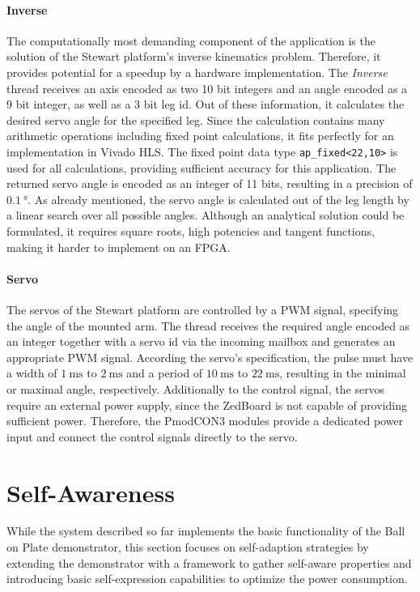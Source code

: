 \paragraph{Inverse} The computationally most demanding component of the
application is the solution of the Stewart platform's inverse kinematics
problem. Therefore, it provides potential for a speedup by a hardware
implementation. The \emph{Inverse} thread receives an axis encoded as two 10
bit integers and an angle encoded as a 9 bit integer, as well as a 3 bit leg
id. Out of these information, it calculates the desired servo angle for the
specified leg. Since the calculation contains many arithmetic operations
including fixed point calculations, it fits perfectly for an implementation in
Vivado HLS. The fixed point data type \lstinline{ap_fixed<22,10>} is used for
all calculations, providing sufficient accuracy for this application. The
returned servo angle is encoded as an integer of 11 bits, resulting in a
precision of $\SI{0.1}{\degree}$. As already mentioned, the servo angle is
calculated out of the leg length by a linear search over all possible angles.
Although an analytical solution could be formulated, it requires square roots,
high potencies and tangent functions, making it harder to implement on an
FPGA.

\paragraph{Servo} The servos of the Stewart platform are controlled by a
\ac{PWM} signal, specifying the angle of the mounted arm. The thread receives
the required angle encoded as an integer together with a servo id via the
incoming mailbox and generates an appropriate \ac{PWM} signal. According the
servo's specification, the pulse must have a width of $\SI{1}{\milli\second}$
to $\SI{2}{\milli\second}$ and a period of $\SI{10}{\milli\second}$ to
$\SI{22}{\milli\second}$, resulting in the minimal or maximal angle,
respectively. Additionally to the control signal, the servos require an
external power supply, since the ZedBoard is not capable of providing
sufficient power. Therefore, the PmodCON3 modules provide a dedicated power
input and connect the control signals directly to the servo.

\section{Self-Awareness}
While the system described so far implements the basic functionality of the
Ball on Plate demonstrator, this section focuses on self-adaption strategies
by extending the demonstrator with a framework to gather self-aware properties
and introducing basic self-expression capabilities to optimize the power
consumption.

